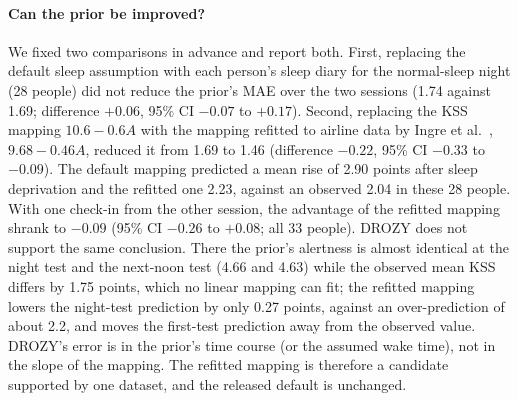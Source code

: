 \paragraph*{Can the prior be improved?} We fixed two comparisons in advance and report both. First, replacing the default sleep assumption with each person's sleep diary for the normal-sleep night (28 people) did not reduce the prior's MAE over the two sessions (1.74 against 1.69; difference $+0.06$, 95\% CI $-0.07$ to $+0.17$). Second, replacing the KSS mapping $10.6 - 0.6A$ with the mapping refitted to airline data by Ingre et al.~\cite{ingre2014validating}, $9.68 - 0.46A$, reduced it from 1.69 to 1.46 (difference $-0.22$, 95\% CI $-0.33$ to $-0.09$). The default mapping predicted a mean rise of 2.90 points after sleep deprivation and the refitted one 2.23, against an observed 2.04 in these 28 people. With one check-in from the other session, the advantage of the refitted mapping shrank to $-0.09$ (95\% CI $-0.26$ to $+0.08$; all 33 people). DROZY does not support the same conclusion. There the prior's alertness is almost identical at the night test and the next-noon test (4.66 and 4.63) while the observed mean KSS differs by 1.75 points, which no linear mapping can fit; the refitted mapping lowers the night-test prediction by only 0.27 points, against an over-prediction of about 2.2, and moves the first-test prediction away from the observed value. DROZY's error is in the prior's time course (or the assumed wake time), not in the slope of the mapping. The refitted mapping is therefore a candidate supported by one dataset, and the released default is unchanged.

